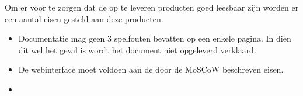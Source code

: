 \subtitle{Kwaliteitseisen op te leveren producten}
Om er voor te zorgen dat de op te leveren producten goed leesbaar zijn worden er een aantal eisen gesteld aan deze producten.

\begin{itemize}
	\item Documentatie mag geen 3 spelfouten bevatten op een enkele pagina. In dien dit wel het geval is wordt het document niet opgeleverd verklaard.
	\item De webinterface moet voldoen aan de door de MoSCoW beschreven eisen.
	\item 
\end{itemize}

